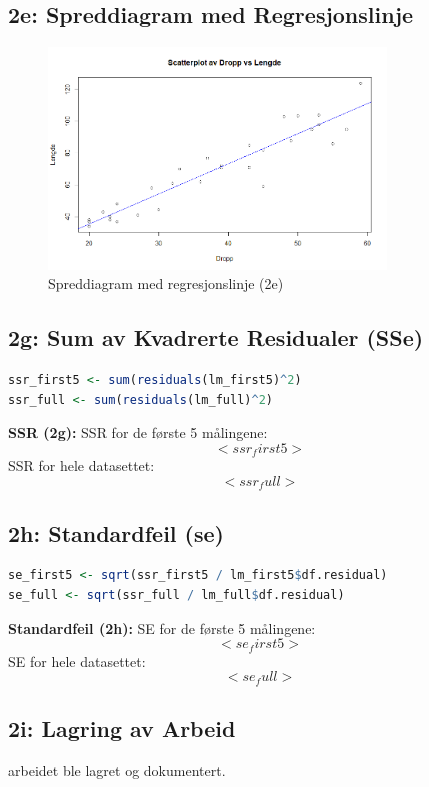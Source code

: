 \documentclass{article}
\begin{document}
\subsection{2e: Spreddiagram med Regresjonslinje}
\begin{figure}[H]
    \centering
    \includegraphics[width=0.8\textwidth]{Rplot02.png}
    \caption{Spreddiagram med regresjonslinje (2e)}
\end{figure}

\subsection{2g: Sum av Kvadrerte Residualer (SSe)}
\begin{lstlisting}[language=R]
ssr_first5 <- sum(residuals(lm_first5)^2)
ssr_full <- sum(residuals(lm_full)^2)
\end{lstlisting}
\textbf{SSR (2g):} SSR for de første 5 målingene: \[ <ssr_first5> \]
SSR for hele datasettet: \[ <ssr_full> \]

\subsection{2h: Standardfeil (se)}
\begin{lstlisting}[language=R]
se_first5 <- sqrt(ssr_first5 / lm_first5$df.residual)
se_full <- sqrt(ssr_full / lm_full$df.residual)
\end{lstlisting}
\textbf{Standardfeil (2h):} SE for de første 5 målingene: \[ <se_first5> \]
SE for hele datasettet: \[ <se_full> \]

\subsection{2i: Lagring av Arbeid}
arbeidet ble lagret og dokumentert.
\end{document}
